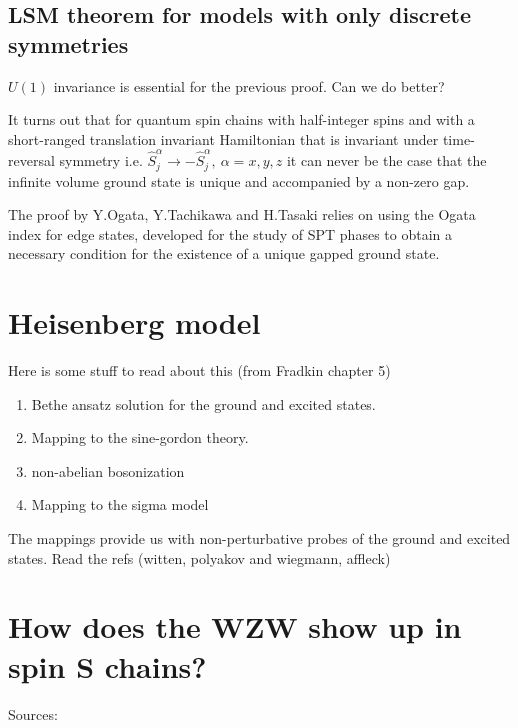 \documentclass{article}
\begin{document}
\subsection{LSM theorem for models with only discrete symmetries}
$U(1)$ invariance is essential for the previous proof. Can we do better?

It turns out that for quantum spin chains with half-integer spins and with a short-ranged translation invariant Hamiltonian that is invariant under time-reversal symmetry i.e. $\hat{S}^{\alpha}_j \to  -\hat{S}^{\alpha}_j,~ \alpha = x, y, z$ it can never be the case that the infinite volume ground state is unique and accompanied by a non-zero gap.

The proof by Y.Ogata, Y.Tachikawa and H.Tasaki relies on using the Ogata index for edge states, developed for the study of SPT phases to obtain a necessary condition for the existence of a unique gapped ground state.
\section{Heisenberg model}
Here is some stuff to read about this (from Fradkin chapter 5)

\begin{enumerate}
    \item Bethe ansatz solution for the ground and excited states.
    \item Mapping to the sine-gordon theory.
    \item non-abelian bosonization
    \item Mapping to the sigma model
\end{enumerate}
The mappings provide us with non-perturbative probes of the ground and excited states. Read the refs (witten, polyakov and wiegmann, affleck)
\section{How does the WZW show up in spin S chains?}
Sources: \cite{Affleck:1987ch}


\end{document}
